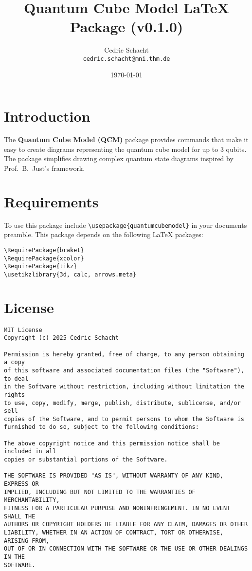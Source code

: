 \documentclass{article}
\title{Quantum Cube Model LaTeX Package (v0.1.0)}
\author{Cedric Schacht \\ \texttt{cedric.schacht@mni.thm.de}}
\date{\today}
\begin{document}
\maketitle

\section*{Introduction}

The \textbf{Quantum Cube Model (QCM)} package provides commands that make it easy to create diagrams representing the quantum cube model for up to 3 qubits.
The package simplifies drawing complex quantum state diagrams inspired by Prof.~B.~Just's framework.

\section*{Requirements}
To use this package include \verb|\usepackage{quantumcubemodel}| in your documents preamble.
This package depends on the following LaTeX packages:
\begin{verbatim}
\RequirePackage{braket}
\RequirePackage{xcolor}
\RequirePackage{tikz}
\usetikzlibrary{3d, calc, arrows.meta}
\end{verbatim}

\section*{License}
\begin{verbatim}
MIT License
Copyright (c) 2025 Cedric Schacht

Permission is hereby granted, free of charge, to any person obtaining a copy
of this software and associated documentation files (the "Software"), to deal
in the Software without restriction, including without limitation the rights
to use, copy, modify, merge, publish, distribute, sublicense, and/or sell
copies of the Software, and to permit persons to whom the Software is
furnished to do so, subject to the following conditions:

The above copyright notice and this permission notice shall be included in all
copies or substantial portions of the Software.

THE SOFTWARE IS PROVIDED "AS IS", WITHOUT WARRANTY OF ANY KIND, EXPRESS OR
IMPLIED, INCLUDING BUT NOT LIMITED TO THE WARRANTIES OF MERCHANTABILITY,
FITNESS FOR A PARTICULAR PURPOSE AND NONINFRINGEMENT. IN NO EVENT SHALL THE
AUTHORS OR COPYRIGHT HOLDERS BE LIABLE FOR ANY CLAIM, DAMAGES OR OTHER
LIABILITY, WHETHER IN AN ACTION OF CONTRACT, TORT OR OTHERWISE, ARISING FROM,
OUT OF OR IN CONNECTION WITH THE SOFTWARE OR THE USE OR OTHER DEALINGS IN THE
SOFTWARE.
\end{verbatim}
\end{document}
